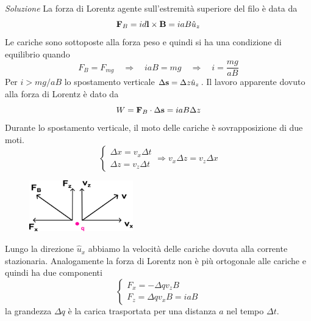 \noindent \textit{Soluzione}
\newline
	La forza di Lorentz agente sull'estremit\`a superiore del filo \`e data da 
	\begin{equation*}
		\bold{F}_{B} = i d\bold{l} \times \bold{B} = ia B \hat{u}_{z}
	\end{equation*}
Le cariche sono sottoposte alla forza peso e quindi si ha una condizione di equilibrio quando
\begin{equation*}
	F_{B} = F_{mg} \quad \Rightarrow \quad iaB =  mg \quad \Rightarrow \quad i = \frac{mg}{aB}
\end{equation*}
Per $i > mg/aB$ lo spostamento verticale $\Delta \bold{s} = \Delta z \hat{u}_{z}$. Il lavoro apparente dovuto alla forza di Lorentz \`e dato da 
\begin{equation*}
	W = \bold{F}_{B} \cdot \Delta \bold{s} = iaB \Delta z 
\end{equation*}
Durante lo spostamento verticale, il moto delle cariche \`e sovrapposizione di due moti.
\begin{equation*}
	\left \{ \begin{array}{l}
		\Delta x = v_x \Delta t \\ 
		\Delta z = v_z \Delta t
	\end{array}\right. \Rightarrow v_{x} \Delta z = v_{z} \Delta x
\end{equation*}
\begin{figure}  %
    \centering
    \includegraphics[width=0.4\textwidth]{images/batteriaplane1}  %
\end{figure}
Lungo la direzione $\hat{u}_{x}$ abbiamo la velocit\`a delle cariche dovuta alla corrente stazionaria. Analogamente la forza di Lorentz non \`e pi\`u ortogonale alle cariche e quindi ha due componenti 
\begin{equation*}
	\left \{ \begin{array}{l}
		F_{x} = - \Delta q v_z B \\ 
		F_z =  \Delta q v_x B = iaB
	\end{array}\right. 
\end{equation*}
la grandezza $\Delta q $ \`e la carica trasportata per una distanza $a$ nel tempo $\Delta t$.


